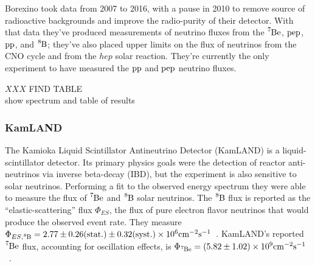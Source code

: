 Borexino took data from 2007 to 2016, with a pause in 2010 to remove source
of radioactive backgrounds and improve the radio-purity of their detector.
With that data they've produced measurements of neutrino fluxes from the $\ce{^{7}Be}$,
$\ce{pep}$, $\ce{pp}$, and $\ce{^{8}B}$; they've also placed upper limits on the flux
of neutrinos from the CNO cycle and from the $hep$ solar reaction.
They're currently the only experiment to have measured the $\ce{pp}$ and $\ce{pep}$ neutrino
fluxes.

$XXX$ FIND TABLE\\
show spectrum and table of results

\subsubsection{KamLAND}
The Kamioka Liquid Scintillator Antineutrino Detector (KamLAND) is a liquid-scintillator detector.
Its primary physics goals were the detection of reactor anti-neutrinos via
inverse beta-decay (IBD),
but the experiment is also sensitive to solar neutrinos.
Performing a fit to the observed energy spectrum they were able to measure
the flux of $\ce{^{7}Be}$ and $\ce{^{8}B}$ solar neutrinos.
The $\ce{^{8}B}$ flux is reported as the ``elastic-scattering'' flux $\Phi_{ES}$, the flux of
pure electron flavor neutrinos that would produce the observed event rate.
They measure $\Phi_{ES\mathrm{,}\ce{^{8}B}} = 2.77 \pm 0.26(\mathrm{stat.}) \pm 0.32(\mathrm{syst.}) \times 10^6 \mathrm{cm}^{-2}\mathrm{s}^{-1}$~\cite{kamland_b8}.
KamLAND's reported $\ce{^{7}Be}$ flux, accounting for oscillation effects,  is
 $\Phi_{\ce{^{7}Be}} = (5.82\pm 1.02)\times10^{9} \mathrm{cm}^{-2}\mathrm{s}^{-1}$~\cite{kamland_be7}.


